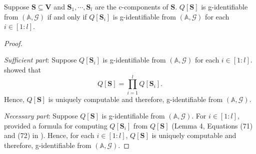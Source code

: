 \documentclass[accepted]{uai2022}
\newenvironment{customprp}[1]{\renewcommand\theproposition{#1}\proposition}{\endproposition}
\newenvironment{myproof}[1][\proofname]{%
  \begin{proof}[#1]$ $\nobreak\ignorespaces
}{%
  \end{proof}
}
\newcommand{\V}[0]{\mathbf{V}}
\newcommand{\G}[0]{\mathcal{G}}
\begin{document}
        \begin{customprp}{\ref{prp: 4}}
            Suppose $\mathbf{S}\subseteq \V$ and $\mathbf{S}_1,\cdots,\mathbf{S}_l$ are the c-components of $\mathbf{S}$. 
            $Q[\mathbf{S}]$ is g-identifiable from $(\mathbb{A}, \G)$ if and only if $Q[\mathbf{S}_i]$ is g-identifiable from $(\mathbb{A}, \G)$ for each $i\in [1:l]$.
        \end{customprp}
        \begin{myproof}[Proof]
            \textit{Sufficient part}: 
            Suppose $Q[\mathbf{S}_i]$ is g-identifiable from $(\mathbb{A}, \G)$ for each $i\in [1:l]$.
            \cite{tian2003ID} showed that 
            \[Q[\mathbf{S}] = \prod_{i=1}^{l}Q[\mathbf{S}_i].\]
            Hence, $Q[\mathbf{S}]$ is uniquely computable and therefore, g-identifiable from $(\mathbb{A}, \G)$. 
            
            \textit{Necessary part}: 
            Suppose $Q[\mathbf{S}]$ is g-identifiable from $(\mathbb{A}, \G)$. 
            For $i\in [1:l]$, \cite{tian2003ID} provided a formula for computing $Q[\mathbf{S}_i]$ from $Q[\mathbf{S}]$ (Lemma 4, Equations (71) and (72) in \citep{tian2003ID}). 
            Hence, for each $i\in [1:l]$, $Q[\mathbf{S}]$ is uniquely computable and therefore, g-identifiable from $(\mathbb{A}, \G)$.
        \end{myproof}
    
\end{document}
